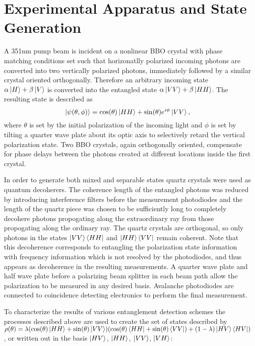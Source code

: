 \documentclass[11pt]{article}
\begin{document}
\section{Experimental Apparatus and State Generation}
A 351nm pump beam is incident on a nonlinear BBO crystal with phase matching conditions set such that horizonatlly 
polarized incoming photons are converted into two vertically polarized photons, immediately followed by a 
similar crystal oriented orthogonally. Therefore an arbitrary incoming state \( \alpha \ket{H} + \beta \ket{V} \) 
is converted into the entangled state \( \alpha \ket{VV} + \beta \ket{HH} \).  The resulting state is described as 
\[ \ket{\psi(\theta, \phi)}  = \cos (\theta) \ket{HH} + \sin (\theta) e^{i\phi} \ket{VV}, \]
where \( \theta \) is set by the initial polarization of the incoming light and \( \phi \) is set by tilting a 
quarter wave plate about its optic axis to selectively retard the vertical polarization state.  Two BBO
crystals, again orthogonally oriented, compensate for phase delays between the photons created at different
locations inside the first crystal\cite{altepeter05}.

In order to generate both mixed and separable states quartz crystals were used as quantum decoherers.
The coherence length of the entangled photons was reduced by introducing interference filters before
the measurement photodiodes and the length of the quartz piece was chosen to be sufficiently long to completely
decohere photons propogating along the extraordinary ray from those propogating along the ordinary
ray.  The quartz crystals are orthogonal, so only photons in the states \( \ket{VV}\bra{HH} \)
and \( \ket{HH}\bra{VV} \) remain coherent.  Note that this decoherence corresponds to entangling the 
polarization state information with frequency 
information which is not resolved by the photodiodes, and thus appears as decoherence in the resulting
measurements\cite{kwiat00}.  A quarter wave plate and half wave plate before a polarizing beam splitter
in each beam path allow the polarization to be measured in any desired basis.  Avalanche photodiodes are
connected to coincidence detecting electronics to perform the final measurement.

To characterize the results of various entanglement detection schemes the processes described above are used to
create the set of states described by 
\( \rho(\theta) = 
\lambda(\cos (\theta) \ket{HH} + \sin (\theta) \ket{VV})(\cos (\theta) \bra{HH} + \sin (\theta) \bra{VV}) + 
(1 - \lambda)\ket{HV}\bra{HV} )\),
 or written out in the basis \(\ket{HV}\), \(\ket{HH}\), \(\ket{VV}\), \(\ket{VH}\):
\end{document}
